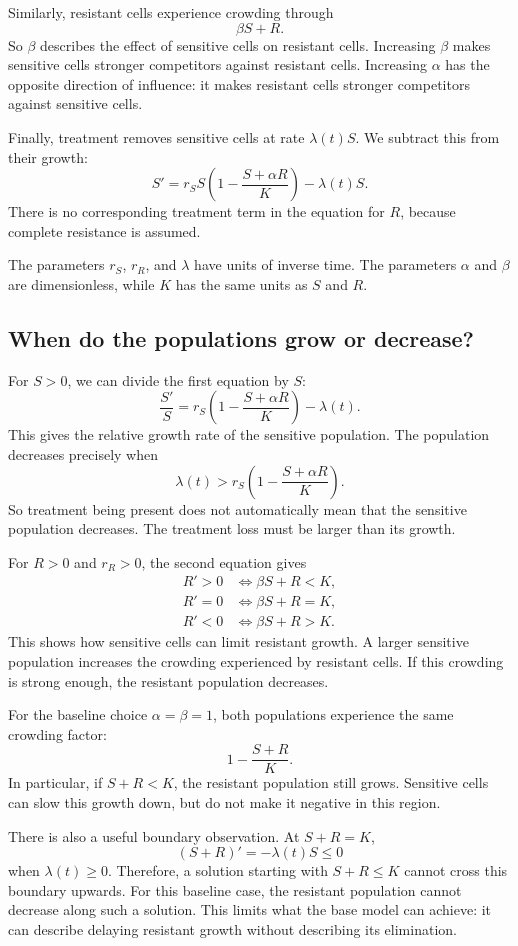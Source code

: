 \documentclass{article}
\begin{document}
Similarly, resistant cells experience crowding through
\[
\beta S+R.
\]
So $\beta$ describes the effect of sensitive cells on
resistant cells. Increasing $\beta$ makes sensitive cells
stronger competitors against resistant cells.
Increasing $\alpha$ has the opposite direction of influence:
it makes resistant cells stronger competitors against
sensitive cells.

Finally, treatment removes sensitive cells at rate
$\lambda(t)S$. We subtract this from their growth:
\[
S'=r_SS\left(1-\frac{S+\alpha R}{K}\right)-\lambda(t)S.
\]
There is no corresponding treatment term in the equation
for $R$, because complete resistance is assumed.

The parameters $r_S$, $r_R$, and $\lambda$ have units of
inverse time. The parameters $\alpha$ and $\beta$ are
dimensionless, while $K$ has the same units as $S$ and $R$.

\subsection{When do the populations grow or decrease?}

For $S>0$, we can divide the first equation by $S$:
\[
\frac{S'}{S}
=
r_S\left(1-\frac{S+\alpha R}{K}\right)-\lambda(t).
\]
This gives the relative growth rate of the sensitive
population. The population decreases precisely when
\[
\lambda(t)>
r_S\left(1-\frac{S+\alpha R}{K}\right).
\]
So treatment being present does not automatically mean
that the sensitive population decreases. The treatment
loss must be larger than its growth.

For $R>0$ and $r_R>0$, the second equation gives
\[
\begin{aligned}
R'>0 &\iff \beta S+R<K,\\
R'=0 &\iff \beta S+R=K,\\
R'<0 &\iff \beta S+R>K.
\end{aligned}
\]
This shows how sensitive cells can limit resistant growth.
A larger sensitive population increases the crowding
experienced by resistant cells. If this crowding is strong
enough, the resistant population decreases.

For the baseline choice $\alpha=\beta=1$, both populations
experience the same crowding factor:
\[
1-\frac{S+R}{K}.
\]
In particular, if $S+R<K$, the resistant population still
grows. Sensitive cells can slow this growth down, but do
not make it negative in this region.

There is also a useful boundary observation. At $S+R=K$,
\[
(S+R)'=-\lambda(t)S\leq 0
\]
when $\lambda(t)\geq 0$. Therefore, a solution starting
with $S+R\leq K$ cannot cross this boundary upwards.
For this baseline case, the resistant population cannot
decrease along such a solution. This limits what the
base model can achieve: it can describe delaying resistant
growth without describing its elimination.
\end{document}
